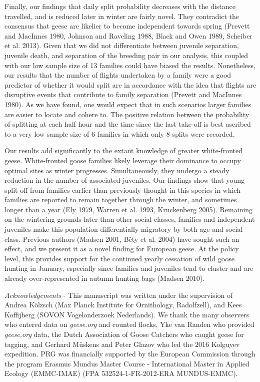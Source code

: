 \documentclass[10pt,twocolumn]{paper}
\begin{document}
Finally, our findings that daily split probability decreases with the
distance travelled, and is reduced later in winter are fairly novel.
They contradict the consensus that geese are likelier to become
independent towards spring (Prevett and MacInnes 1980, Johnson and
Raveling 1988, Black and Owen 1989, Scheiber et al. 2013). Given that we
did not differentiate between juvenile separation, juvenile death, and
separation of the breeding pair in our analysis, this coupled with our
low sample size of 13 families could have biased the results.
Nonetheless, our results that the number of flights undertaken by a
family were a good predictor of whether it would split are in accordance
with the idea that flights are disruptive events that contribute to
family separation (Prevett and MacInnes 1980). As we have found, one
would expect that in such scenarios larger families are easier to locate
and cohere to. The positive relation between the probability of
splitting at each half hour and the time since the last take-off is best
ascribed to a very low sample size of 6 families in which only 8 splits
were recorded.

Our results add significantly to the extant knowledge of greater
white-fronted geese. White-fronted goose families likely leverage their
dominance to occupy optimal sites as winter progresses. Simultaneously,
they undergo a steady reduction in the number of associated juveniles.
Our findings show that young split off from families earlier than
previously thought in this species in which families are reported to
remain together through the winter, and sometimes longer than a year
(Ely 1979, Warren et al. 1993, Kruckenberg 2005). Remaining on the
wintering grounds later than other social classes, families and
independent juveniles make this population differentially migratory by
both age and social class. Previous authors (Madsen 2001, Bêty et al.
2004) have sought such an effect, and we present it as a novel finding
for European geese. At the policy level, this provides support for the
continued yearly cessation of wild goose hunting in January, especially
since families and juveniles tend to cluster and are already
over-represented in autumn hunting bags (Madsen 2010).

\emph{Acknowledgements} - This manuscript was written under the
supervision of Andrea Kölzsch (Max Planck Institute for Ornithology,
Radolfzell), and Kees Koffijberg (SOVON Vogelonderzoek Nederlands). We
thank the many observers who entered data on \emph{geese.org} and
counted flocks, Yke van Randen who provided \emph{geese.org} data, the
Dutch Association of Goose Catchers who caught geese for tagging, and
Gerhard Müskens and Peter Glazov who led the 2016 Kolguyev expedition.
PRG was financially supported by the European Commission through the
program Erasmus Mundus Master Course - International Master in Applied
Ecology (EMMC-IMAE) (FPA 532524-1-FR-2012-ERA MUNDUS-EMMC).
\end{document}
